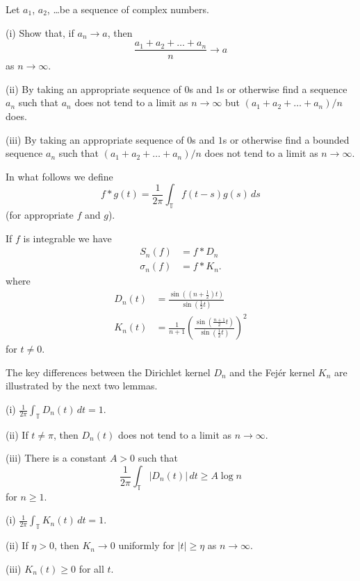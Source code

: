 \begin{exercise} Let $a_{1}$, $a_{2}$, \dots be a sequence
of complex numbers.

(i) Show that, if $a_{n}\rightarrow a$, then
\[\frac{a_{1}+a_{2}+\dots+a_{n}}{n}\rightarrow a\]
as $n\rightarrow\infty$.

(ii) By taking an appropriate sequence of $0$s and $1$s
or otherwise find a sequence $a_{n}$ such that
$a_{n}$ does not tend to a limit as $n\rightarrow\infty$
but $(a_{1}+a_{2}+\dots+a_{n})/n$ does.

(iii) By taking an appropriate sequence of $0$s and $1$s
or otherwise find a bounded sequence $a_{n}$ such that
$(a_{1}+a_{2}+\dots+a_{n})/n$ does not tend to a limit
as $n\rightarrow\infty$.
\end{exercise}

In what follows we define
\[f*g(t)=\frac{1}{2\pi}\int_{\mathbb T}f(t-s)g(s)\,ds\]
(for appropriate $f$ and $g$).
\begin{lemma} If $f$ is integrable we have
\begin{align*}
S_{n}(f)&=f*D_{n}\\
\sigma_{n}(f)&=f*K_{n}.
\end{align*}
where
\begin{align*}
D_{n}(t)&=\frac{\sin((n+\tfrac{1}{2})t)}{\sin(\tfrac{1}{2}t)}\\
K_{n}(t)&=\frac{1}{n+1}\left(\frac{\sin(\tfrac{n+1}{2}t)}
{\sin(\tfrac{1}{2}t)}\right)^{2}
\end{align*}
for $t\neq 0$.
\end{lemma}

The key differences between the Dirichlet kernel $D_{n}$
and the Fej\'{e}r kernel $K_{n}$ are illustrated
by the next two lemmas.

\begin{lemma} (i)
${\displaystyle \frac{1}{2\pi}\int_{\mathbb T}D_{n}(t)\, dt=1}$.

(ii) If $t\neq \pi$, then $D_{n}(t)$ does not tend to
a limit as $n\rightarrow\infty$.

(iii) There is a constant $A>0$ such that
\[\frac{1}{2\pi}\int_{\mathbb T}|D_{n}(t)|\, dt\geq A\log n\]
for $n\geq 1$.
\end{lemma}

\begin{lemma}\label{Fejer positive}
(i) $\displaystyle{\frac{1}{2\pi}\int_{\mathbb T}K_{n}(t)\, dt=1}$.

(ii) If $\eta>0$, then $K_{n}\rightarrow 0$ uniformly
for $|t|\geq \eta$
as $n\rightarrow\infty$.

(iii) $K_{n}(t)\geq 0$ for all $t$.
\end{lemma}

